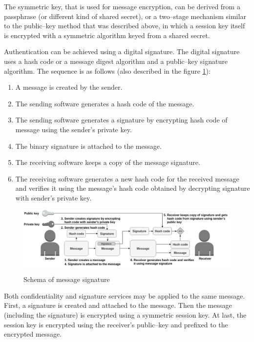 The symmetric key, that is used for message encryption, can be derived from a passphrase (or different kind of shared secret), or a two--stage mechanism similar to the public--key method that was described above, in which a session key itself is encrypted with a symmetric algorithm keyed from a shared secret.

Authentication can be achieved using a digital signature. The digital signature uses a hash code or a message digest algorithm and a public--key signature algorithm. The sequence is as follows (also described in the figure \ref{img:messageSignature}):
\begin{enumerate}
    \item A message is created by the sender.
    \item The sending software generates a hash code of the message.
    \item The sending software generates a signature by encrypting hash code of message using the sender's private key.
    \item The binary signature is attached to the message.
    \item The receiving software keeps a copy of the message signature.
    \item The receiving software generates a new hash code for the received message and verifies it using the message's hash code obtained by decrypting signature with sender's private key.
\end{enumerate}

\begin{figure}[H]
    \begin{center}
        \label{img:messageSignature}
        \includegraphics[width=1.0\textwidth]{obrazky-figures/messageSignature.png}
        \caption{Schema of message signature}
    \end{center}
\end{figure}

Both confidentiality and signature services may be applied to the same message. First, a signature is created and attached to the message. Then the message (including the signature) is encrypted using a symmetric session key. At last, the session key is encrypted using the receiver's public--key and prefixed to the encrypted message.

